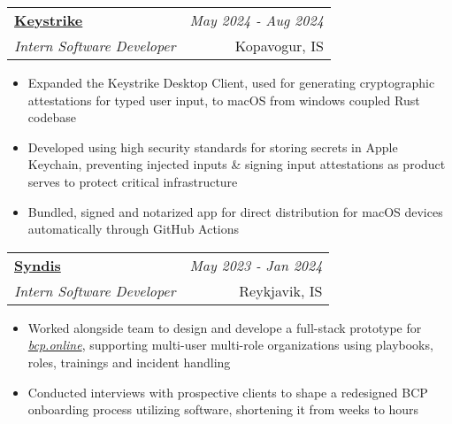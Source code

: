\documentclass{article}
\makeatletter
\newcommand{\resumeSubheading}[4]{
\vspace{0.5mm}
    \begin{tabular*}{0.98\textwidth}[t]{l@{\extracolsep{\fill}}r}
		\textbf{\normalsize{#1}} & \textit{\footnotesize{#4}} \\
        \textit{\footnotesize{#3}} &  \footnotesize{#2}\\
    \end{tabular*}
    \vspace{-2.4mm}
}
\newcommand{\resumeItemListStart}{\begin{itemize}[leftmargin=*,labelsep=1mm,itemsep=0.5mm]\normalsize}
\newcommand{\resumeItemListEnd}{\end{itemize}\vspace{-2mm}}
\makeatother
\begin{document}
  \resumeSubheading
      {\href{https://keystrike.com}{Keystrike}}{Kopavogur, IS}
	  {Intern Software Developer}{May 2024 - Aug 2024}
      \resumeItemListStart
	    \item Expanded the Keystrike Desktop Client, used for generating cryptographic attestations for typed user input, to macOS from windows coupled Rust codebase



		\item Developed using high security standards for storing secrets in Apple Keychain, preventing injected inputs \& signing input attestations as product serves to protect critical infrastructure

		\item Bundled, signed and notarized app for direct distribution for macOS devices automatically through GitHub Actions 
      \resumeItemListEnd 

  \resumeSubheading
    {\href{https://www.syndis.is}{Syndis}}{Reykjavik, IS}
    {Intern Software Developer}{May 2023 - Jan 2024}
    \resumeItemListStart
\item Worked alongside team to design and develope a full-stack prototype for \href{https://bcp.online}{\emph{bcp.online}}, supporting 
			multi-user multi-role organizations using playbooks, roles, trainings and incident handling

	  \item Conducted interviews with prospective clients to shape a redesigned BCP onboarding process utilizing software, shortening it from weeks to hours
    \resumeItemListEnd
	
\end{document}
